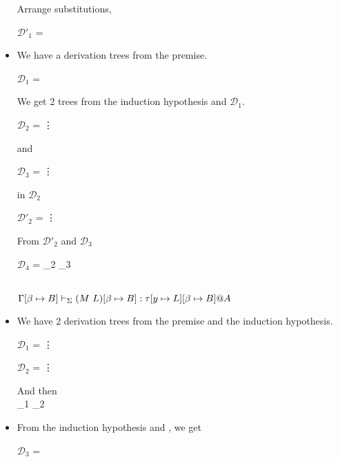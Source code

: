 \begin{itemize}
	Arrange substitutions,

	$\mathcal{D}'_1$ = 
	{ \andalso {}}

	\item \TApp

	We have a derivation trees from the premise.

	$\mathcal{D}_1$ = 
	{}

	We get 2 trees from the induction hypothesis and $\mathcal{D}_1$.

	$\mathcal{D}_2$ = 
	{\vdots}

	and

	$\mathcal{D}_3$ = 
	{\vdots}

	 in $\mathcal{D}_2$

	$\mathcal{D'}_2$ = 
	{\vdots}

	From $\mathcal{D'}_2$ and $\mathcal{D}_3$

	$\mathcal{D}_4$ = 
	{_2 \andalso {}_3}

	 \\
	$\GGV (M\ L)\SB: \tau[y \mapsto L]\SB@A$

	\item \TConv

	We have 2 derivation trees from the premise and the induction hypothesis.

	$\mathcal{D}_1$ = 
	{\vdots}

	$\mathcal{D}_2$ = 
	{\vdots}

	And then \\
	{_1 \andalso {}_2}

	\item \TTB

	From the induction hypothesis and \TTB, we get

	$\mathcal{D}_3$ = 
	{}


\end{itemize}
